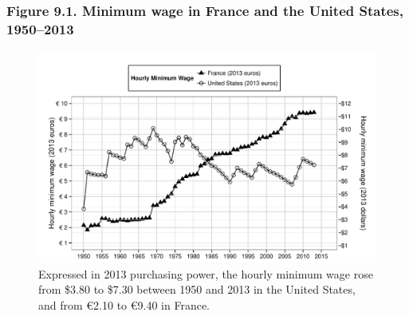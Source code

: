 \documentclass[t]{beamer}\usepackage[]{graphicx}\usepackage[]{color}
\newenvironment{knitrout}{}{} %
\begin{document}
\begin{frame}[label=Figure_9_1]
\frametitle{Figure 9.1. Minimum wage in France and the United States, 1950--2013}
\begin{figure}[t]
\begin{minipage}[b]{\textwidth}
\centering

\begin{knitrout}\footnotesize
{}\color{fgcolor}

{\centering \includegraphics[width=1\linewidth]{figures/bw/Figure_9_1} 

}



\end{knitrout}
\caption{Expressed in 2013 purchasing power, the hourly minimum wage rose from \$3.80 to \$7.30 between 1950 and 2013 in the United States, and from \euro 2.10 to \euro 9.40 in France.}
\end{minipage}
\end{figure}
\end{frame}
\end{document}
